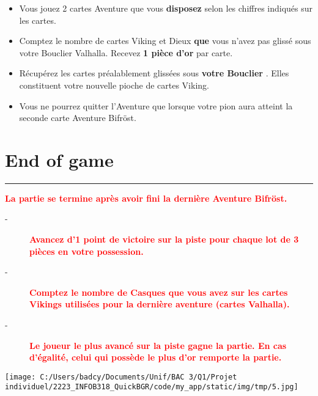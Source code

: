 \documentclass{scrartcl}%
\begin{document}
\begin{itemize}%
\item%
%
 Vous jouez 2 cartes Aventure que vous %
\textcolor{mygreen}{%
\textbf{disposez}%
}%
\textit{ }%
 selon les chiffres indiqués sur les cartes.
%
\item%
%
 Comptez le nombre de cartes Viking et Dieux %
\textcolor{mygreen}{%
\textbf{que}%
}%
\textit{ }%
 vous n'avez pas glissé sous votre Bouclier Valhalla. Recevez %
\textcolor{mygreen}{%
\textbf{1 pièce d'or}%
}%
\textit{ }%
 par carte.
%
\item%
%
 Récupérez les cartes préalablement glissées sous %
\textcolor{mygreen}{%
\textbf{votre Bouclier}%
}%
. Elles constituent votre nouvelle pioche de cartes Viking.
%
\item%
%
 Vous ne pourrez quitter l'Aventure que lorsque votre pion aura atteint la seconde carte Aventure Bifröst.
%
\end{itemize}

%
\sectionfont{\color{red}}%
\subsectionfont{\color{red}}%
\subsubsectionfont{\color{red}}%
\section{ End of game
}%
\label{sec:Endofgame}%
\textcolor{red}{\rule{18cm}{0.07cm}}\break%
\textcolor{red}{%
\textbf{La partie se termine après avoir fini la dernière Aventure Bifröst.}%
}%

%
\begin{description}%
\item[{-} ]%
%
\textcolor{red}{%
\textbf{Avancez d'1 point de victoire sur la piste pour chaque lot de 3 pièces en votre possession.}%
}%

%
\item[{-} ]%
%
\textcolor{red}{%
\textbf{Comptez le nombre de Casques que vous avez sur les cartes Vikings utilisées pour la dernière aventure (cartes Valhalla).}%
}%

%
\item[{-} ]%
%
\textcolor{red}{%
\textbf{Le joueur le plus avancé sur la piste gagne la partie. En cas d'égalité, celui qui possède le plus d'or remporte la partie.}%
}%

%
\end{description}%
%
\begin{center}\texttt{[image: C:/Users/badcy/Documents/Unif/BAC 3/Q1/Projet individuel/2223\_INFOB318\_QuickBGR/code/my\_app/static/img/tmp/5.jpg]}\end{center}%

%
\end{document}
